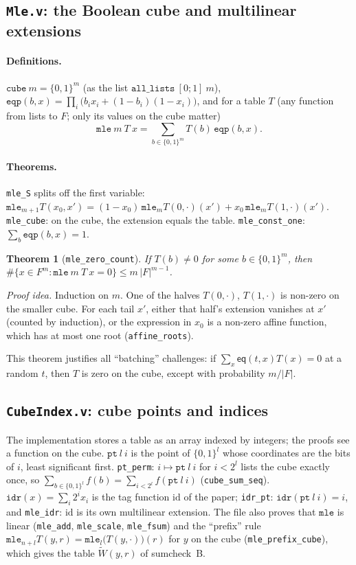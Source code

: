 \documentclass[11pt,a4paper]{article}
\newcommand{\eq}{\mathsf{eq}}
\newcommand{\mle}[1]{\widetilde{#1}}
\theoremstyle{definition}
\theoremstyle{plain}
\newtheorem{theorem}[definition]{Theorem}
\begin{document}
\subsection{\texttt{Mle.v}: the Boolean cube and multilinear extensions}

\paragraph{Definitions.} $\mathtt{cube}\ m=\{0,1\}^m$ (as the list $\mathtt{all\_lists}\ [0;1]\ m$),
$\mathtt{eqp}(b,x)=\prod_i\bigl(b_ix_i+(1-b_i)(1-x_i)\bigr)$, and for a table $T$ (any function from
lists to $F$; only its values on the cube matter)
\[
  \mathtt{mle}\ m\ T\ x=\sum_{b\in\{0,1\}^m}T(b)\,\mathtt{eqp}(b,x).
\]
\paragraph{Theorems.} \texttt{mle\_S} splits off the first variable:
$\mathtt{mle}_{m+1}T(x_0,x')=(1-x_0)\,\mathtt{mle}_m T(0,\cdot)(x')+x_0\,\mathtt{mle}_mT(1,\cdot)(x')$.
\texttt{mle\_cube}: on the cube, the extension equals the table. \texttt{mle\_const\_one}:
$\sum_b\mathtt{eqp}(b,x)=1$.
\begin{theorem}[\texttt{mle\_zero\_count}]
If $T(b)\ne0$ for some $b\in\{0,1\}^m$, then $\#\{x\in F^m:\mathtt{mle}\ m\ T\ x=0\}\le m\,|F|^{m-1}$.
\end{theorem}
\emph{Proof idea.} Induction on $m$. One of the halves $T(0,\cdot)$, $T(1,\cdot)$ is non-zero on the
smaller cube. For each tail $x'$, either that half's extension vanishes at $x'$ (counted by
induction), or the expression in $x_0$ is a non-zero affine function, which has at most one root
(\texttt{affine\_roots}).

This theorem justifies all ``batching'' challenges: if $\sum_x\eq(t,x)T(x)=0$ at a random $t$,
then $T$ is zero on the cube, except with probability $m/|F|$.

\subsection{\texttt{CubeIndex.v}: cube points and indices}

The implementation stores a table as an array indexed by integers; the proofs see a function on
the cube. $\mathtt{pt}\ l\ i$ is the point of $\{0,1\}^l$ whose coordinates are the bits of $i$,
least significant first. \texttt{pt\_perm}: $i\mapsto\mathtt{pt}\ l\ i$ for $i<2^l$ lists the cube
exactly once, so $\sum_{b\in\{0,1\}^l}f(b)=\sum_{i<2^l}f(\mathtt{pt}\ l\ i)$ (\texttt{cube\_sum\_seq}).
$\mathtt{idr}(x)=\sum_i2^ix_i$ is the tag function $\mathrm{id}$ of the paper; \texttt{idr\_pt}:
$\mathtt{idr}(\mathtt{pt}\ l\ i)=i$, and \texttt{mle\_idr}: $\mathrm{id}$ is its own multilinear
extension. The file also proves that $\mathtt{mle}$ is linear (\texttt{mle\_add}, \texttt{mle\_scale},
\texttt{mle\_fsum}) and the ``prefix'' rule
$\mathtt{mle}_{n+l}T(y,r)=\mathtt{mle}_l\bigl(T(y,\cdot)\bigr)(r)$ for $y$ on the cube
(\texttt{mle\_prefix\_cube}), which gives the table $\mle W(y,r)$ of sumcheck~B.
\end{document}
